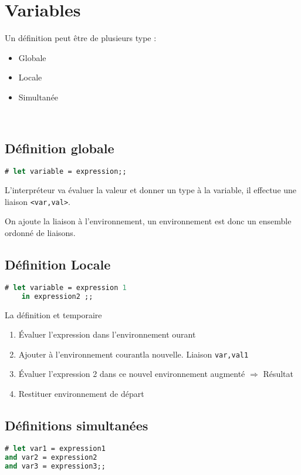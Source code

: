 \documentclass[12pt,a4paper,openany]{book}
\begin{document}
	\section{Variables}
	Un définition peut être de plusieurs type : 
	\begin{itemize}
		\item Globale
		\item Locale
		\item Simultanée
	\end{itemize}
~
	\subsection{Définition globale}
	\begin{lstlisting}[language=Caml, caption=Définition de variable]
# let variable = expression;;
	\end{lstlisting}
	L'interpréteur va évaluer la valeur et donner un type à la variable, il effectue une liaison \texttt{<var,val>}.

	On ajoute la liaison à l'environnement, un environnement est donc un ensemble ordonné de liaisons.
	\subsection{Définition Locale}
	\begin{lstlisting}[language=Caml, caption=Définition de variable]
# let variable = expression 1
	in expression2 ;;
	\end{lstlisting}
	La définition et temporaire
	\begin{enumerate}
		\item Évaluer l'expression dans l'environnement ourant
		\item Ajouter à l'environnement courantla nouvelle. Liaison \texttt{var,val1}
		\item Évaluer l'expression 2 dans ce nouvel environnement augmenté $\Rightarrow$ Résultat
		\item Restituer environnement de départ
	\end{enumerate}

	\subsection{Définitions simultanées}
	\begin{lstlisting}[language=Caml, caption=Définition de variable]
# let var1 = expression1 
and var2 = expression2
and var3 = expression3;;
\end{lstlisting}
	

	
	
\end{document}
